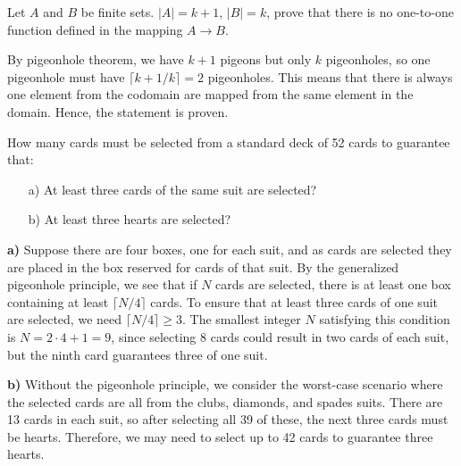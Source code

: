     \begin{exercise}
        Let $A$ and $B$ be finite sets. $|A| = k+1$, $|B| = k$, prove that there is no one-to-one function defined in the mapping $A \to B$.
    \end{exercise}
        \begin{solution}
            By pigeonhole theorem, we have $k+1$ pigeons but only $k$ pigeonholes, so one pigeonhole must have $\lceil k+1/k \rceil = 2$ pigeonholes. This means that there is always one
            element from the codomain are mapped from the same element in the domain. Hence, the statement is proven.
        \end{solution}
        \begin{exercise}
            How many cards must be selected from a standard deck of 52 cards to guarantee that:
            \begin{enumerate}
                \item[a)] At least three cards of the same suit are selected?
                \item[b)] At least three hearts are selected?
            \end{enumerate}
            \end{exercise}
            
            \begin{solution}
            \textbf{a)} Suppose there are four boxes, one for each suit, and as cards are selected they are placed in the box reserved for cards of that suit. By the generalized pigeonhole principle, we see that if \( N \) cards are selected, there is at least one box containing at least \( \lceil N/4 \rceil \) cards. To ensure that at least three cards of one suit are selected, we need \( \lceil N/4 \rceil \geq 3 \). The smallest integer \( N \) satisfying this condition is \( N = 2 \cdot 4 + 1 = 9 \), since selecting 8 cards could result in two cards of each suit, but the ninth card guarantees three of one suit.
            
            \textbf{b)} Without the pigeonhole principle, we consider the worst-case scenario where the selected cards are all from the clubs, diamonds, and spades suits. There are 13 cards in each suit, so after selecting all 39 of these, the next three cards must be hearts. Therefore, we may need to select up to 42 cards to guarantee three hearts.
        \end{solution}
            

